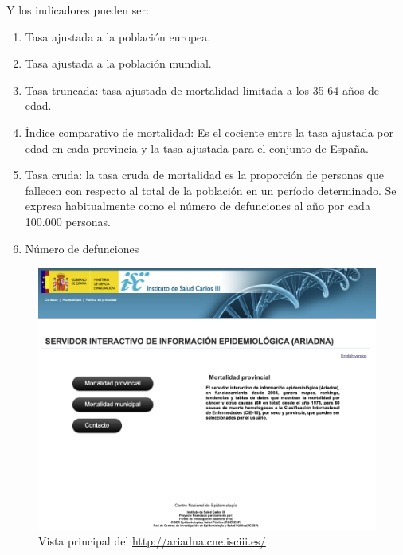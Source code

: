 Y los indicadores pueden ser:
\begin{enumerate}
  \item Tasa ajustada a la población europea.
  \item Tasa ajustada a la población mundial.
  \item Tasa truncada: tasa ajustada de mortalidad limitada a los 35-64 años de edad.
  \item Índice comparativo de mortalidad: Es el cociente entre la tasa ajustada por edad en cada provincia y la tasa
  ajustada para el conjunto de España.
  \item Tasa cruda: la tasa cruda de mortalidad es la proporción de personas que fallecen con respecto al total
  de la población en un período determinado. Se expresa habitualmente como el número de defunciones al año
  por cada 100.000 personas.
  \item Número de defunciones
\end{enumerate}
\FloatBarrier
\begin{figure}[]
	\centering
	\includegraphics[scale=0.5]{doc/logos/imgs/ariadna1.png}
	\caption{ Vista principal del \href{servidor Arïadna}{http://ariadna.cne.isciii.es/} }
    \label{fig:worst_f_value}
\end{figure}

